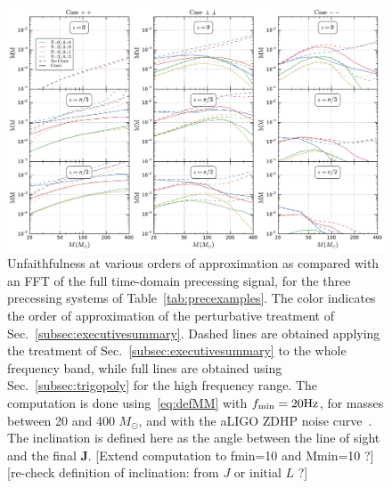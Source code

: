 \documentclass[aps,showpacs,twocolumn,
prd,superscriptaddress,nofootinbib]{revtex4-1}
\newcommand{\Msol}{M_{\odot}}
\newcommand{\SM}[1]{{\color{Red} #1}}
\begin{document}
\begin{figure}
  \centering
  \includegraphics[width=.98\linewidth]{plots/precMM_py.pdf}
  \caption{Unfaithfulness at various orders of approximation as compared with an FFT of the full time-domain precessing signal, for the three precessing systems of Table~\ref{tab:precexamples}. The color indicates the order of approximation of the perturbative treatment of Sec.~\ref{subsec:executivesummary}. Dashed lines are obtained applying the treatment of Sec.~\ref{subsec:executivesummary} to the whole frequency band, while full lines are obtained using Sec.~\ref{subsec:trigopoly} for the high frequency range. The computation is done using~\eqref{eq:defMM} with $f_{\rm min} = 20\mathrm{Hz}$, for masses between 20 and 400 $\Msol$, and with the aLIGO ZDHP noise curve~\cite{LIGOProspects13}. The inclination is defined here as the angle between the line of sight and the final $\bm{J}$. \SM{[Extend computation to fmin=10 and Mmin=10 ?]} \SM{[re-check definition of inclination: from $J$ or initial $L$ ?]} }
  \label{fig:precunfaithfulness}
\end{figure}
\end{document}
